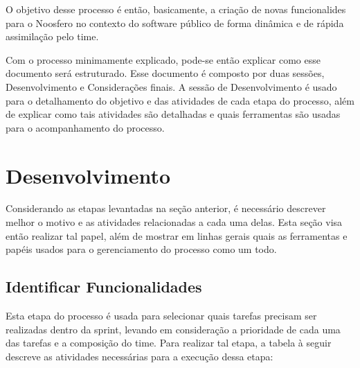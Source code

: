 \documentclass[a4paper, 11pt]{article}
\begin{document}
O objetivo desse processo é então, basicamente, a criação de novas
funcionalides para o Noosfero no contexto do software público de forma
dinâmica e de rápida assimilação pelo time.

Com o processo minimamente explicado, pode-se então explicar como esse
documento será estruturado. Esse documento é composto por duas sessões,
Desenvolvimento e Considerações finais. A sessão de Desenvolvimento é usado
para o detalhamento do objetivo e das atividades de cada etapa do processo,
além de explicar como tais atividades são detalhadas e quais ferramentas são
usadas para o acompanhamento do processo.


\section*{Desenvolvimento}

Considerando as etapas levantadas na seção anterior, é necessário descrever
melhor o motivo e as atividades relacionadas a cada uma delas. Esta seção visa
então realizar tal papel, além de mostrar em linhas gerais quais as
ferramentas e papéis usados para o gerenciamento do processo como um todo.

\subsection*{Identificar Funcionalidades}

Esta etapa do processo é usada para selecionar quais tarefas precisam ser
realizadas dentro da sprint, levando em consideração a prioridade de cada uma
das tarefas e a composição do time. Para realizar tal etapa, a tabela à seguir
descreve as atividades necessárias para a execução dessa etapa:
\end{document}
